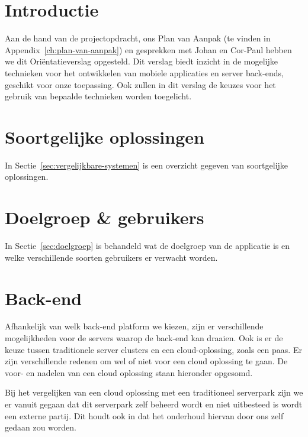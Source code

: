 \section{Introductie}

\ifx\aanleiding\undefined

\fi

Aan de hand van de projectopdracht, ons Plan van Aanpak (te vinden in Appendix~\ref{ch:plan-van-aanpak}) en gesprekken met Johan en Cor-Paul hebben we dit Ori\"entatieverslag opgesteld. Dit verslag biedt inzicht in de mogelijke technieken voor het ontwikkelen van mobiele applicaties en server back-ends, geschikt voor onze toepassing. Ook zullen in dit verslag de keuzes voor het gebruik van bepaalde technieken worden toegelicht.

\section{Soortgelijke oplossingen}

\ifx\vergelijkbaresystemen\undefined

\else
In Sectie~\ref{sec:vergelijkbare-systemen} is een overzicht gegeven van soortgelijke oplossingen.
\fi

\section{Doelgroep \& gebruikers}

\ifx\doelgroep\undefined

\else
In Sectie~\ref{sec:doelgroep} is behandeld wat de doelgroep van de applicatie is en welke verschillende soorten gebruikers er verwacht worden.
\fi

\section{Back-end}\label{sec:orientatie-back-end}
Afhankelijk van welk back-end platform we kiezen, zijn er verschillende mogelijkheden voor de servers waarop de back-end kan draaien. Ook is er de keuze tussen traditionele server clusters en een cloud-oplossing, zoals een \ac{paas}. Er zijn verschillende redenen om wel of niet voor een cloud oplossing te gaan. De voor- en nadelen van een cloud oplossing staan hieronder opgesomd.

Bij het vergelijken van een cloud oplossing met een traditioneel serverpark zijn we er vanuit gegaan dat dit serverpark zelf beheerd wordt en niet uitbesteed is wordt een externe partij. Dit houdt ook in dat het onderhoud hiervan door ons zelf gedaan zou worden.

